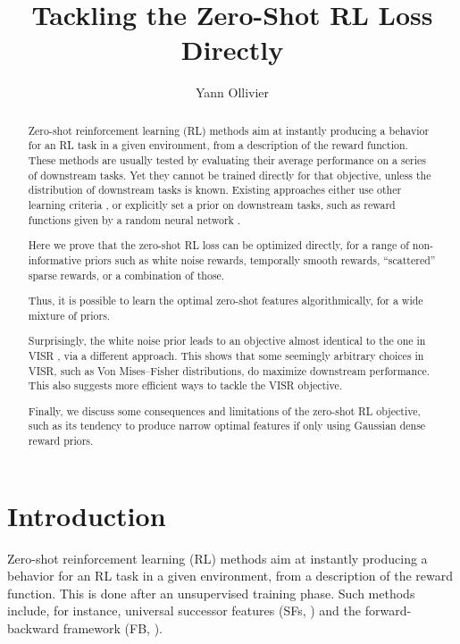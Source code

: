 \documentclass[11pt,a4paper]{article}
\title{Tackling the Zero-Shot RL Loss Directly}
\author{Yann Ollivier}
\date{}
\begin{document}
\maketitle

\begin{abstract}
Zero-shot reinforcement learning (RL) methods aim at instantly producing a behavior for an RL task in a given environment, from a description of the reward function.  These methods are usually tested by evaluating their average performance on a series of downstream tasks. Yet they cannot be trained directly for that objective, unless the distribution of downstream tasks is known.  Existing approaches either use other learning criteria \cite{borsa2018universal,zeroshot,allpolicies,visr}, or explicitly set a prior on downstream tasks, such as reward functions given by a random neural network \cite{frans2024unsupervised}.

Here we prove that the zero-shot RL loss can be optimized directly, for a range of non-informative priors such as white noise rewards, temporally smooth rewards, ``scattered'' sparse rewards, or a combination of those.

Thus, it is possible to learn the optimal zero-shot features algorithmically, for a wide mixture of priors.

Surprisingly, the white noise prior leads to an objective almost identical to the one in VISR \cite{visr}, via a different approach. This shows that some seemingly arbitrary choices in VISR, such as Von Mises--Fisher distributions, do maximize downstream performance. This also suggests more efficient ways to tackle the VISR objective.

Finally, we discuss some consequences and limitations of the zero-shot RL objective, such as its tendency to produce narrow optimal features if only using Gaussian dense reward priors.
\end{abstract}


\section{Introduction}

Zero-shot reinforcement learning (RL) methods aim at instantly producing
a behavior for an RL task in a given environment, from a description of
the reward function. This is done after an unsupervised training phase.
Such methods include, for instance, universal successor features (SFs,
\cite{borsa2018universal}) and the forward-backward framework (FB,
\cite{zeroshot, allpolicies}).
\end{document}
